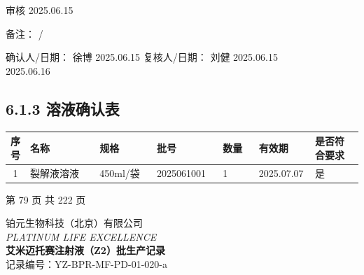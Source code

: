 \documentclass[UTF8,10pt,a4paper,fontset=fandol]{ctexart}
\newcommand{\fieldvalue}[1]{#1}
\newcommand{\handwritten}[1]{#1}
\begin{document}
\handwritten{审核 2025.06.15}

备注：
\fieldvalue{\handwritten{/}}

\medskip
确认人/日期：
\fieldvalue{\handwritten{徐博}}\quad
\fieldvalue{\handwritten{2025.06.15}}
\hfill
复核人/日期：
\fieldvalue{\handwritten{刘健}}\quad
\fieldvalue{\handwritten{2025.06.15\\2025.06.16}}

\subsection*{6.1.3 溶液确认表}

\begin{center}
\small
\begin{tabular}{|c|p{0.22\linewidth}|p{0.17\linewidth}|p{0.19\linewidth}|p{0.11\linewidth}|p{0.16\linewidth}|p{0.16\linewidth}|}
\hline
序号 & 名称 & 规格 & 批号 & 数量 & 有效期 & 是否符合要求\\
\hline
1 &
\fieldvalue{裂解液溶液} &
\fieldvalue{450ml/袋} &
\fieldvalue{\handwritten{2025061001}} &
\fieldvalue{\handwritten{1}} &
\fieldvalue{\handwritten{2025.07.07}} &
\fieldvalue{\handwritten{是}}\\
\hline
\end{tabular}
\end{center}

\begin{center}
第 79 页 共 222 页
\end{center}

\newpage

\begin{center}
铂元生物科技（北京）有限公司\\
\textit{PLATINUM LIFE EXCELLENCE} \\
\textbf{艾米迈托赛注射液（Z2）批生产记录}\\
记录编号：YZ-BPR-MF-PD-01-020-a
\end{center}
\end{document}
